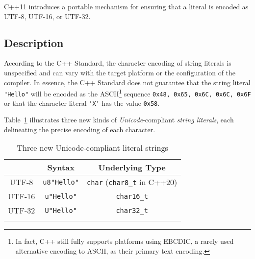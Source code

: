 

\setcounter{table}{0}
\setcounter{footnote}{0}
\setcounter{lstlisting}{0}

C++11 introduces a portable mechanism for ensuring that a literal is
encoded as UTF-8, UTF-16, or UTF-32.

\subsection[Description]{Description}\label{description-unicodestring}

According to the C++ Standard, the character encoding of string literals
is unspecified and can vary with the target platform or the configuration of
the compiler. In essence, the C++ Standard does not guarantee that the
string literal \texttt{"Hello"} will be encoded as the
ASCII{\cprotect\footnote{In fact, C++ still fully supports platforms
  using EBCDIC, a rarely used alternative encoding to ASCII, as their primary text encoding.}} sequence
\texttt{{0x48,} \texttt{0x65,} \texttt{0x6C,} \texttt{0x6C,} \texttt{0x6F}}
or that the character literal \texttt{'X'} has the value
\texttt{0x58}.

Table~\ref{unicodestring-table1} illustrates three new kinds of \emph{Unicode}-compliant
\emph{string literals}, each delineating the precise encoding of each
character.
 \begin{table}[h!]
\begin{center}
\begin{threeparttable}
\caption{Three new Unicode-compliant literal strings}\label{unicodestring-table1}\vspace{1.5ex}
{\small \begin{tabular}{c|c|c}\thickhline
\rowcolor[gray]{.9}{\sffamily\bfseries Encoding} & {\sffamily\bfseries Syntax} & {\sffamily\bfseries Underlying Type}\\ \hline
UTF-8   &  \texttt{u8"Hello"} & \texttt{char} (\texttt{char8\_t} in C++20) \\ \hline
UTF-16 & \texttt{u"Hello"}  & \texttt{char16\_t} \\ \hline
UTF-32  & \texttt{U"Hello"} & \texttt{char32\_t}\\ \thickhline
\end{tabular}
} %
\end{threeparttable}
\end{center}
\end{table}


